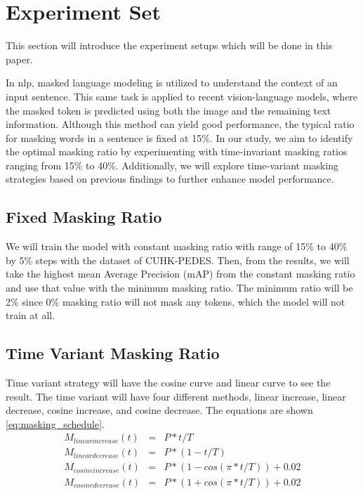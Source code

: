 \section{Experiment Set}
This section will introduce the experiment setups which will be done in this paper.

In \acrshort{nlp}, masked language modeling is utilized to understand the context of an input sentence. This same task is applied to recent vision-language models, where the masked token is predicted using both the image and the remaining text information. Although this method can yield good performance, the typical ratio for masking words in a sentence is fixed at 15\%. 
In our study, we aim to identify the optimal masking ratio by experimenting with time-invariant masking ratios ranging from 15\% to 40\%. Additionally, we will explore time-variant masking strategies based on previous findings to further enhance model performance.

\subsection{Fixed Masking Ratio}
We will train the model with constant masking ratio with range of 15\% to 40\% by 5\% steps with the dataset of CUHK-PEDES. Then, from the results, we will take the highest mean Average Precision (mAP) from the constant masking ratio and use that value with the minimum masking ratio. The minimum ratio will be 2\% since 0\% masking ratio will not mask any tokens, which the model will not train at all. 


\subsection{Time Variant Masking Ratio}

Time variant strategy will have the cosine curve and linear curve to see the result. The time variant will have four different methods, linear increase, linear decrease, cosine increase, and cosine decrease. The equations are shown \ref{eq:masking_schedule}. 
\begin{eqnarray}
M_{linear increase}\left( t \right) &=& P*t/T \\
M_{linear decrease}\left( t \right) &=& P*\left(1-t/T\right) \\
M_{cosine increase}\left(t\right) &=& P*\left(1-cos\left(\pi*t/T\right)\right) + 0.02 \\
M_{cosine decrease}\left(t\right) &=& P*\left(1+cos\left(\pi*t/T\right)\right) + 0.02 
\label{eq:masking_schedule}
\end{eqnarray}

